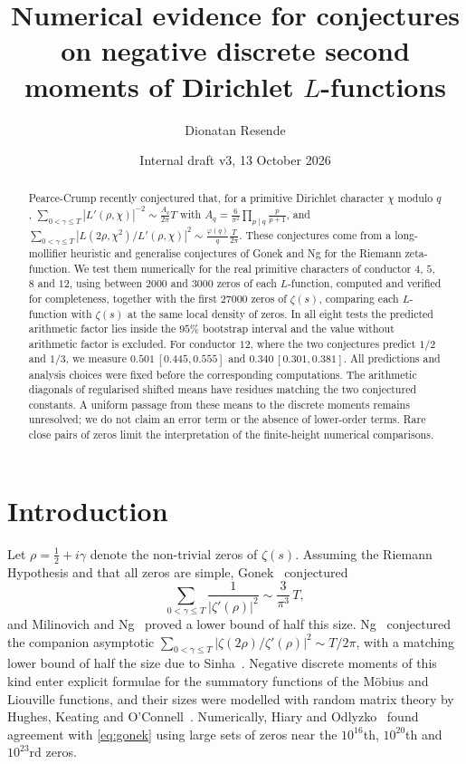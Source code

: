 \documentclass[11pt]{amsart}
\title[Numerical evidence for negative discrete moments of Dirichlet $L$-functions]{Numerical evidence for conjectures on negative discrete second moments of Dirichlet $L$-functions}
\author{Dionatan Resende}
\date{Internal draft v3, 13 October 2026}
\newcommand{\Lp}{L'}
\begin{document}
\begin{abstract}
Pearce-Crump recently conjectured that, for a primitive Dirichlet character $\chi$ modulo $q$,
$\sum_{0<\gamma\le T}|\Lp(\rho,\chi)|^{-2}\sim \frac{A_q}{2\pi}T$ with
$A_q=\frac{6}{\pi^2}\prod_{p\mid q}\frac{p}{p+1}$, and
$\sum_{0<\gamma\le T}|L(2\rho,\chi^2)/\Lp(\rho,\chi)|^{2}\sim\frac{\varphi(q)}{q}\frac{T}{2\pi}$.
These conjectures come from a long-mollifier heuristic and generalise conjectures of Gonek and Ng for the Riemann
zeta-function. We test them numerically for the real primitive characters of conductor $4$, $5$, $8$ and $12$, using
between $2000$ and $3000$ zeros of each $L$-function, computed and verified for completeness, together with the first
$27000$ zeros of $\zeta(s)$, comparing each $L$-function with $\zeta(s)$ at the same local density of zeros. In all
eight tests the predicted arithmetic factor lies inside the $95\%$ bootstrap interval and the value without arithmetic
factor is excluded. For conductor $12$, where the two conjectures predict $1/2$ and $1/3$, we measure
$0.501\,[0.445,0.555]$ and $0.340\,[0.301,0.381]$. All predictions and analysis choices were fixed before the
corresponding computations. The arithmetic diagonals of regularised shifted means have residues matching the two
conjectured constants. A uniform passage from these means to the discrete moments remains unresolved; we do not
claim an error term or the absence of lower-order terms. Rare close pairs of zeros limit the interpretation of the
finite-height numerical comparisons.
\end{abstract}

\maketitle

\section{Introduction}

Let $\rho=\tfrac12+i\gamma$ denote the non-trivial zeros of $\zeta(s)$. Assuming the Riemann Hypothesis and that all
zeros are simple, Gonek~\cite{Gonek} conjectured
\begin{equation}\label{eq:gonek}
\sum_{0<\gamma\le T}\frac{1}{|\zeta'(\rho)|^{2}}\sim\frac{3}{\pi^{3}}\,T,
\end{equation}
and Milinovich and Ng~\cite{MN} proved a lower bound of half this size. Ng~\cite{Ng} conjectured the companion asymptotic
$\sum_{0<\gamma\le T}|\zeta(2\rho)/\zeta'(\rho)|^{2}\sim T/2\pi$, with a matching lower bound of half the size due to
Sinha~\cite{Sinha}. Negative discrete moments of this kind enter explicit formulae for the summatory functions of the
M\"obius and Liouville functions, and their sizes were modelled with random matrix theory by Hughes, Keating and
O'Connell~\cite{HKO}. Numerically, Hiary and Odlyzko~\cite{HO} found agreement with \eqref{eq:gonek} using large sets
of zeros near the $10^{16}$th, $10^{20}$th and $10^{23}$rd zeros.
\end{document}
